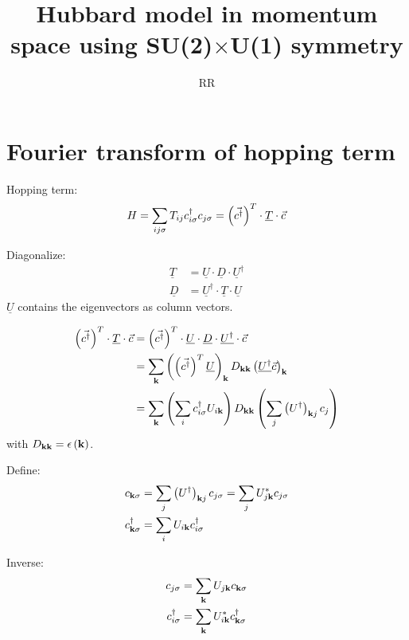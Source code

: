 \documentclass[12pt,paper=a4]{article}
\title{Hubbard model in momentum space using SU(2)$\times$U(1) symmetry}
\author{RR}
\renewcommand{\c}[1]{c_{#1}}
\newcommand{\cdag}[1]{c^{\dagger}_{#1}}
\newcommand{\cs}[1]{c_{#1\sigma}}
\newcommand{\cdags}[1]{c^{\dagger}_{#1\sigma}}
\newcommand{\Udag}[0]{U^{\dagger}}
\begin{document}
\maketitle

\section{Fourier transform of hopping term}

Hopping term:
\begin{equation}
H = \sum_{ij\sigma} T_{ij} \cdags{i}\cs{j} = \lr{\vec{\cdag{}}}^{T} \cdot \underline{T} \cdot \vec{c}
\end{equation}

Diagonalize:
\begin{equation}
\begin{split}
\underline{T} &= \underline{U} \cdot \underline{D} \cdot \underline{U}^{\dagger}\\ 
\underline{D} &= \underline{U}^{\dagger} \cdot \underline{T} \cdot \underline{U}
\end{split}
\end{equation}
$\underline{U}$ contains the eigenvectors as column vectors.

\begin{equation}
\begin{split}
\lr{\vec{\cdag{}}}^{T} \cdot \underline{T} \cdot \vec{c} 
&= \lr{\vec{\cdag{}}}^{T} \cdot \underline{U} \cdot \underline{D} \cdot \underline{\Udag} \cdot \vec{c}\\
&= \sum_{\v{k}} \lr{\lr{\vec{\cdag{}}}^T \underline{U}}_{{\v{k}}} D_{{\v{k}}{\v{k}}} \lr{\underline{\Udag}\vec{c}}_{{\v{k}}}\\
&= \sum_{{\v{k}}} \lr{\sum_i \cdags{i} U_{i{\v{k}}}}  D_{{\v{k}}{\v{k}}} \lr{\sum_j \lr{\Udag}_{{\v{k}}j} \c{j}}
\end{split}
\end{equation}
with $D_{\mathbf{k}\mathbf{k}}=\epsilon\left(\mathbf{k}\right)$.

Define:
\begin{equation}
\begin{split}
\cs{\v{k}} &= \sum_j \lr{\Udag}_{{\v{k}}j} \cs{j} = \sum_j U^{*}_{j\v{k}} \cs{j}\\
\cdags{\v{k}} &= \sum_i U_{i\v{k}} \cdags{i}
\end{split}
\end{equation}

Inverse:
\begin{equation}
\begin{split}
\cs{j} &= \sum_{\v{k}} U_{j\v{k}} \cs{\v{k}}\\
\cdags{i} &= \sum_{\v{k}} U^*_{i\v{k}} \cdags{\v{k}}
\end{split}
\end{equation}
\end{document}
